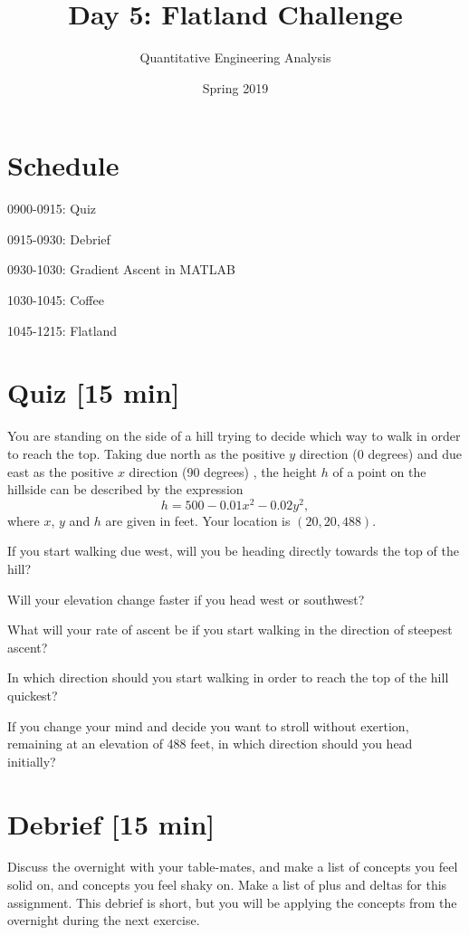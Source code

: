 \documentclass{tufte-handout}
\title{Day 5: Flatland Challenge}
\author{Quantitative Engineering Analysis}
\date{Spring 2019}
\begin{document}
\maketitle
\thispagestyle{firstpage}

\section{Schedule}
\bi
\item 0900-0915: Quiz
\item 0915-0930: Debrief
\item 0930-1030: Gradient Ascent in MATLAB
\item 1030-1045: Coffee
\item 1045-1215: Flatland

\ei

\section{Quiz [15 min]}

You are standing on the side of a hill trying to decide which way to walk in order to reach the top. 
Taking due north as the positive $y$ direction (0 degrees) and due east as the positive $x$ direction (90 degrees) , the height $h$ of a point on the hillside can be described by the expression 
\[ h = 500 - 0.01x^2 - 0.02y^2,\]
where $x$, $y$ and $h$ are given in feet.  Your location is $(20, 20, 488)$.  
\be
\item If you start walking due west, will you be heading directly towards the top of the hill?
\item Will your elevation change faster if you head west or southwest?
\item What will your rate of ascent be if you start walking in the direction of steepest ascent?
\item In which direction should you start walking in order to reach the top of the hill quickest?  
\item If you change your mind and decide you want to stroll without exertion, remaining at an elevation of 488 feet, in which direction should you head initially?
\ee


\section{Debrief [15 min]}

Discuss the overnight with your table-mates, and make a list of concepts you feel solid on, and concepts you feel shaky on. Make a list of plus and deltas for this assignment. This debrief is short, but you will be applying the concepts from the overnight during the next exercise.
\end{document}
